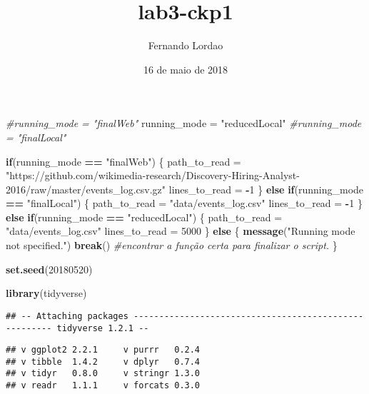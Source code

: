 \documentclass[]{article}
\title{lab3-ckp1}
\author{Fernando Lordao}
\date{16 de maio de 2018}
\newenvironment{Shaded}{\begin{snugshade}}{\end{snugshade}}
\newcommand{\KeywordTok}[1]{\textcolor[rgb]{0.13,0.29,0.53}{\textbf{#1}}}
\newcommand{\DecValTok}[1]{\textcolor[rgb]{0.00,0.00,0.81}{#1}}
\newcommand{\StringTok}[1]{\textcolor[rgb]{0.31,0.60,0.02}{#1}}
\newcommand{\CommentTok}[1]{\textcolor[rgb]{0.56,0.35,0.01}{\textit{#1}}}
\newcommand{\ControlFlowTok}[1]{\textcolor[rgb]{0.13,0.29,0.53}{\textbf{#1}}}
\newcommand{\OperatorTok}[1]{\textcolor[rgb]{0.81,0.36,0.00}{\textbf{#1}}}
\newcommand{\NormalTok}[1]{#1}
\begin{document}
\maketitle

\begin{Shaded}
\begin{Highlighting}[]
\CommentTok{#running_mode = "finalWeb"}
\NormalTok{running_mode =}\StringTok{ "reducedLocal"}
\CommentTok{#running_mode = "finalLocal"}

\ControlFlowTok{if}\NormalTok{(running_mode }\OperatorTok{==}\StringTok{ "finalWeb"}\NormalTok{) \{}
\NormalTok{    path_to_read =}\StringTok{ "https://github.com/wikimedia-research/Discovery-Hiring-Analyst-2016/raw/master/events_log.csv.gz"}
\NormalTok{    lines_to_read =}\StringTok{ }\OperatorTok{-}\DecValTok{1}
\NormalTok{\} }\ControlFlowTok{else} \ControlFlowTok{if}\NormalTok{(running_mode }\OperatorTok{==}\StringTok{ "finalLocal"}\NormalTok{) \{}
\NormalTok{    path_to_read =}\StringTok{ "data/events_log.csv"}
\NormalTok{    lines_to_read =}\StringTok{ }\OperatorTok{-}\DecValTok{1}
\NormalTok{\} }\ControlFlowTok{else} \ControlFlowTok{if}\NormalTok{(running_mode }\OperatorTok{==}\StringTok{ "reducedLocal"}\NormalTok{) \{}
\NormalTok{    path_to_read =}\StringTok{ "data/events_log.csv"}
\NormalTok{    lines_to_read =}\StringTok{ }\DecValTok{5000}
\NormalTok{\} }\ControlFlowTok{else}\NormalTok{ \{}
    \KeywordTok{message}\NormalTok{(}\StringTok{"Running mode not specified."}\NormalTok{)}
    \ControlFlowTok{break}\NormalTok{() }\CommentTok{#encontrar a função certa para finalizar o script.}
\NormalTok{\}}

\KeywordTok{set.seed}\NormalTok{(}\DecValTok{20180520}\NormalTok{)}
\end{Highlighting}
\end{Shaded}

\begin{Shaded}
\begin{Highlighting}[]
\KeywordTok{library}\NormalTok{(tidyverse)}
\end{Highlighting}
\end{Shaded}

\begin{verbatim}
## -- Attaching packages ------------------------------------------------------ tidyverse 1.2.1 --
\end{verbatim}

\begin{verbatim}
## v ggplot2 2.2.1     v purrr   0.2.4
## v tibble  1.4.2     v dplyr   0.7.4
## v tidyr   0.8.0     v stringr 1.3.0
## v readr   1.1.1     v forcats 0.3.0
\end{verbatim}
\end{document}
